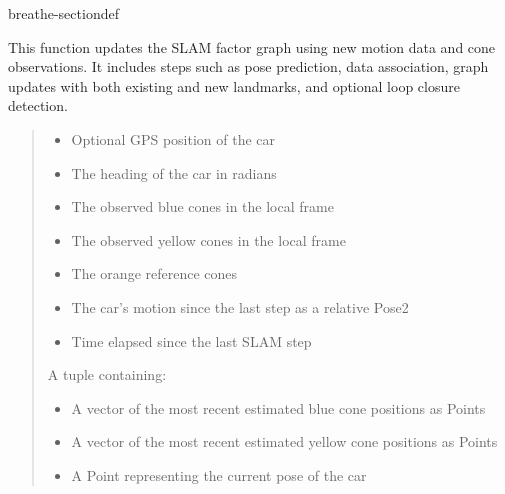 \documentclass[letterpaper,10pt,english]{sphinxmanual}
\begin{document}
\begin{fulllineitems}
\begin{sphinxuseclass}{breathe-sectiondef}
\begin{fulllineitems}
\sphinxAtStartPar
This function updates the SLAM factor graph using new motion data and cone observations. It includes steps such as pose prediction, data association, graph updates with both existing and new landmarks, and optional loop closure detection.
\begin{quote}\begin{description}
\begin{itemize}
\item {} 
\sphinxAtStartPar
{} \textendash{} Optional GPS position of the car 

\item {} 
\sphinxAtStartPar
{} \textendash{} The heading of the car in radians 

\item {} 
\sphinxAtStartPar
{} \textendash{} The observed blue cones in the local frame 

\item {} 
\sphinxAtStartPar
{} \textendash{} The observed yellow cones in the local frame 

\item {} 
\sphinxAtStartPar
{} \textendash{} The orange reference cones 

\item {} 
\sphinxAtStartPar
{} \textendash{} The car’s motion since the last step as a relative Pose2 

\item {} 
\sphinxAtStartPar
{} \textendash{} Time elapsed since the last SLAM step

\end{itemize}

\sphinxAtStartPar
A tuple containing:\begin{itemize}
\item {} 
\sphinxAtStartPar
A vector of the most recent estimated blue cone positions as Points

\item {} 
\sphinxAtStartPar
A vector of the most recent estimated yellow cone positions as Points

\item {} 
\sphinxAtStartPar
A Point representing the current pose of the car 

\end{itemize}


\end{description}\end{quote}

\end{fulllineitems}


\end{sphinxuseclass}
\end{fulllineitems}
\end{document}
